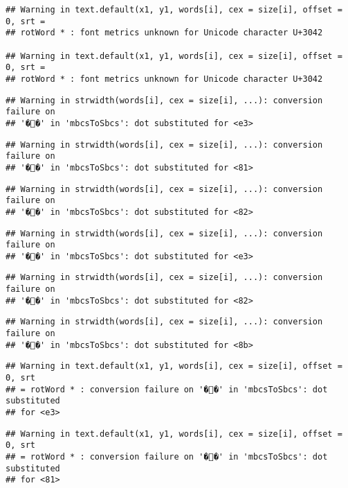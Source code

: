 \documentclass[]{article}
\begin{document}
\begin{verbatim}
## Warning in text.default(x1, y1, words[i], cex = size[i], offset = 0, srt =
## rotWord * : font metrics unknown for Unicode character U+3042

## Warning in text.default(x1, y1, words[i], cex = size[i], offset = 0, srt =
## rotWord * : font metrics unknown for Unicode character U+3042
\end{verbatim}

\begin{verbatim}
## Warning in strwidth(words[i], cex = size[i], ...): conversion failure on
## '��' in 'mbcsToSbcs': dot substituted for <e3>
\end{verbatim}

\begin{verbatim}
## Warning in strwidth(words[i], cex = size[i], ...): conversion failure on
## '��' in 'mbcsToSbcs': dot substituted for <81>
\end{verbatim}

\begin{verbatim}
## Warning in strwidth(words[i], cex = size[i], ...): conversion failure on
## '��' in 'mbcsToSbcs': dot substituted for <82>
\end{verbatim}

\begin{verbatim}
## Warning in strwidth(words[i], cex = size[i], ...): conversion failure on
## '��' in 'mbcsToSbcs': dot substituted for <e3>
\end{verbatim}

\begin{verbatim}
## Warning in strwidth(words[i], cex = size[i], ...): conversion failure on
## '��' in 'mbcsToSbcs': dot substituted for <82>
\end{verbatim}

\begin{verbatim}
## Warning in strwidth(words[i], cex = size[i], ...): conversion failure on
## '��' in 'mbcsToSbcs': dot substituted for <8b>
\end{verbatim}

\begin{verbatim}
## Warning in text.default(x1, y1, words[i], cex = size[i], offset = 0, srt
## = rotWord * : conversion failure on '��' in 'mbcsToSbcs': dot substituted
## for <e3>
\end{verbatim}

\begin{verbatim}
## Warning in text.default(x1, y1, words[i], cex = size[i], offset = 0, srt
## = rotWord * : conversion failure on '��' in 'mbcsToSbcs': dot substituted
## for <81>
\end{verbatim}
\end{document}
